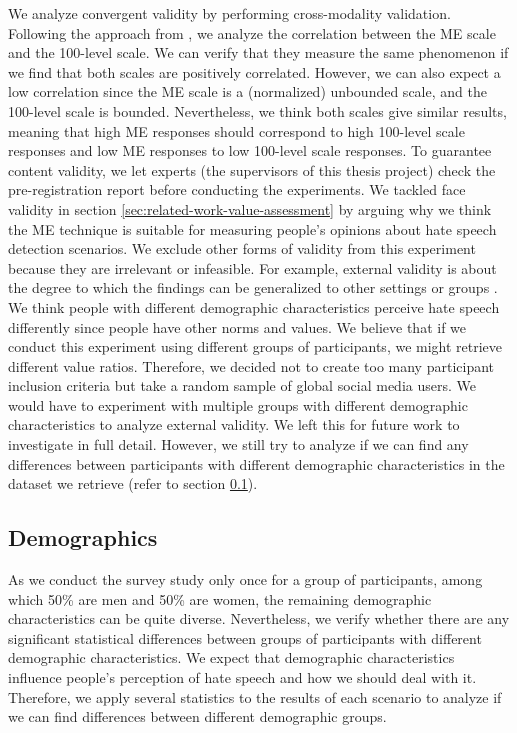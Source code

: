 %
We analyze convergent validity by performing cross-modality validation.
%
Following the approach from \citet{roitero2018fine}, we analyze the correlation between the ME scale and the 100-level scale.
%
We can verify that they measure the same phenomenon if we find that both scales are positively correlated.
%
However, we can also expect a low correlation since the ME scale is a (normalized) unbounded scale, and the 100-level scale is bounded.
%
Nevertheless, we think both scales give similar results, meaning that high ME responses should correspond to high 100-level scale responses and low ME responses to low 100-level scale responses.
%
To guarantee content validity, we let experts (the supervisors of this thesis project) check the pre-registration report before conducting the experiments.
%
We tackled face validity in section \ref{sec:related-work-value-assessment} by arguing why we think the ME technique is suitable for measuring people's opinions about hate speech detection scenarios.
%
We exclude other forms of validity from this experiment because they are irrelevant or infeasible.
%
For example, external validity is about the degree to which the findings can be generalized to other settings or groups \citep{fitzner2007reliability}.
%
We think people with different demographic characteristics perceive hate speech differently since people have other norms and values.
%
We believe that if we conduct this experiment using different groups of participants, we might retrieve different value ratios.
%
Therefore, we decided not to create too many participant inclusion criteria but take a random sample of global social media users.
%
We would have to experiment with multiple groups with different demographic characteristics to analyze external validity.
%
We left this for future work to investigate in full detail.
%
However, we still try to analyze if we can find any differences between participants with different demographic characteristics in the dataset we retrieve (refer to section \ref{sec:analysis-demographic}).

\subsection{Demographics}
\label{sec:analysis-demographic}
As we conduct the survey study only once for a group of participants, among which 50\% are men and 50\% are women, the remaining demographic characteristics can be quite diverse.
%
Nevertheless, we verify whether there are any significant statistical differences between groups of participants with different demographic characteristics.
%
We expect that demographic characteristics influence people's perception of hate speech and how we should deal with it.
%
Therefore, we apply several statistics to the results of each scenario to analyze if we can find differences between different demographic groups.
%

